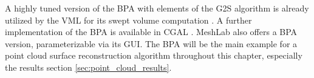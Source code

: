 \begin{description}
	A highly tuned version of the BPA with elements of the G2S algorithm is already utilized by the VML for its swept volume computation \cite{bpa_vml}.
	A further implementation of the BPA is available in CGAL \cite{cgal_bpa}.
	MeshLab also offers a BPA version, parameterizable via its GUI.
	The BPA will be the main example for a point cloud surface reconstruction algorithm throughout this chapter, especially the results section \ref{sec:point_cloud_results}.

%


\end{description}
